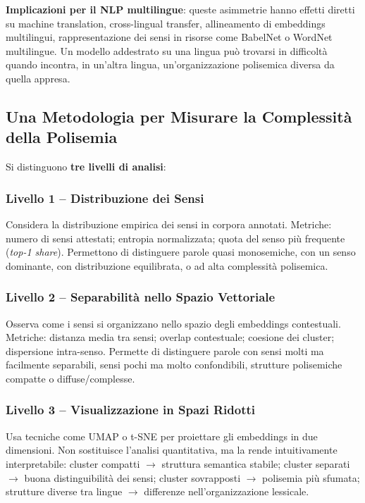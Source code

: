 \documentclass[12pt,a4paper]{article}
\begin{document}
\textbf{Implicazioni per il NLP multilingue}: queste asimmetrie hanno effetti diretti su machine translation, cross-lingual transfer, allineamento di embeddings multilingui, rappresentazione dei sensi in risorse come BabelNet o WordNet multilingue. Un modello addestrato su una lingua pu\`o trovarsi in difficolt\`a quando incontra, in un'altra lingua, un'organizzazione polisemica diversa da quella appresa.

\subsection{Una Metodologia per Misurare la Complessit\`a della Polisemia}

Si distinguono \textbf{tre livelli di analisi}:

\subsubsection{Livello 1 -- Distribuzione dei Sensi}

Considera la distribuzione empirica dei sensi in corpora annotati. Metriche: numero di sensi attestati; entropia normalizzata; quota del senso pi\`u frequente (\emph{top-1 share}). Permettono di distinguere parole quasi monosemiche, con un senso dominante, con distribuzione equilibrata, o ad alta complessit\`a polisemica.

\subsubsection{Livello 2 -- Separabilit\`a nello Spazio Vettoriale}

Osserva come i sensi si organizzano nello spazio degli embeddings contestuali. Metriche: distanza media tra sensi; overlap contestuale; coesione dei cluster; dispersione intra-senso. Permette di distinguere parole con sensi molti ma facilmente separabili, sensi pochi ma molto confondibili, strutture polisemiche compatte o diffuse/complesse.

\subsubsection{Livello 3 -- Visualizzazione in Spazi Ridotti}

Usa tecniche come UMAP o t-SNE per proiettare gli embeddings in due dimensioni. Non sostituisce l'analisi quantitativa, ma la rende intuitivamente interpretabile: cluster compatti $\to$ struttura semantica stabile; cluster separati $\to$ buona distinguibilit\`a dei sensi; cluster sovrapposti $\to$ polisemia pi\`u sfumata; strutture diverse tra lingue $\to$ differenze nell'organizzazione lessicale.
\end{document}

